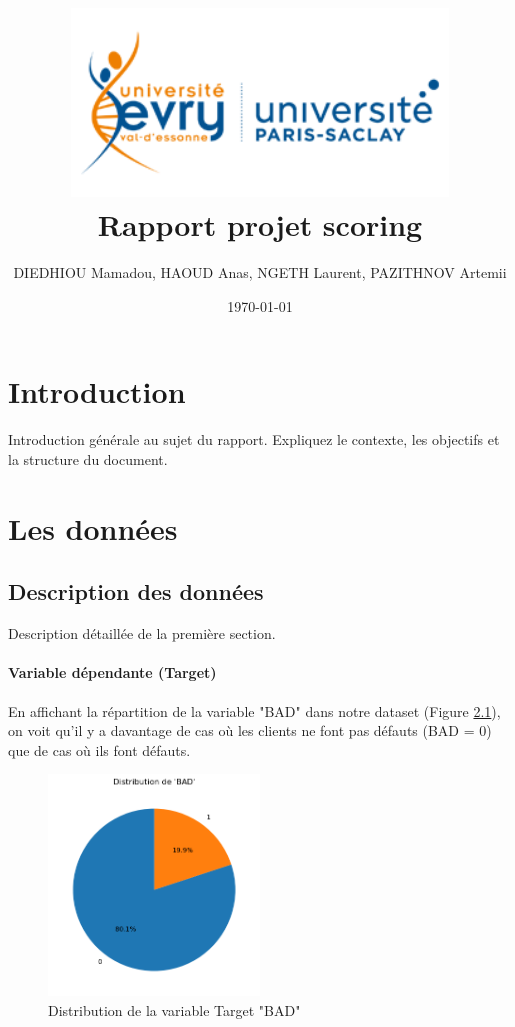 \documentclass[a4paper,12pt]{report}
\title{
  \includegraphics[width=10cm]{../images/logo-univ-evry.png} \\[1cm] %
  \textbf{Rapport projet scoring}
}
\author{DIEDHIOU Mamadou, HAOUD Anas, NGETH Laurent, PAZITHNOV Artemii}
\date{\today}
\begin{document}
\maketitle

\tableofcontents
\newpage

\chapter{Introduction}
Introduction générale au sujet du rapport. Expliquez le contexte, les objectifs et la structure du document.

\chapter{Les données}
\section{Description des données}
Description détaillée de la première section.

\subsubsection{Variable dépendante (Target)}

En affichant la répartition de la variable "BAD" dans notre dataset (Figure \ref{fig:dis_target}), on voit qu'il y a davantage de cas où les clients ne font pas défauts (BAD = 0)
que de cas où ils font défauts.

\begin{figure}[h!]
  \begin{center}
    \includegraphics[width=0.5\textwidth]{target_distribution}
  \end{center}
  \caption{Distribution de la variable Target "BAD"}
  \label{fig:dis_target}
\end{figure}
\end{document}
